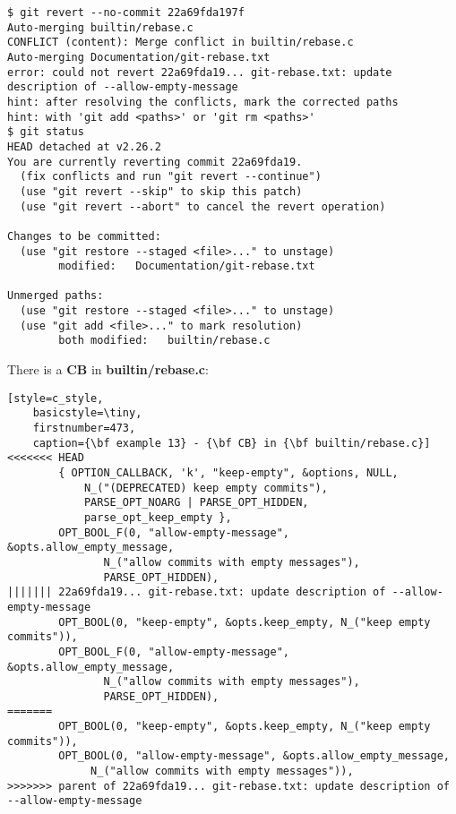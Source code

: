 \begin{lstlisting}[style=console_style,
	basicstyle=\tiny,
	caption={\bf example 13} - Reverting]
$ git revert --no-commit 22a69fda197f
Auto-merging builtin/rebase.c
CONFLICT (content): Merge conflict in builtin/rebase.c
Auto-merging Documentation/git-rebase.txt
error: could not revert 22a69fda19... git-rebase.txt: update description of --allow-empty-message
hint: after resolving the conflicts, mark the corrected paths
hint: with 'git add <paths>' or 'git rm <paths>'
$ git status
HEAD detached at v2.26.2
You are currently reverting commit 22a69fda19.
  (fix conflicts and run "git revert --continue")
  (use "git revert --skip" to skip this patch)
  (use "git revert --abort" to cancel the revert operation)

Changes to be committed:
  (use "git restore --staged <file>..." to unstage)
        modified:   Documentation/git-rebase.txt

Unmerged paths:
  (use "git restore --staged <file>..." to unstage)
  (use "git add <file>..." to mark resolution)
        both modified:   builtin/rebase.c
\end{lstlisting}

There is a {\bf CB} in {\bf builtin/rebase.c}:
\begin{lstlisting}[style=c_style,
	basicstyle=\tiny,
	firstnumber=473,
	caption={\bf example 13} - {\bf CB} in {\bf builtin/rebase.c}]
<<<<<<< HEAD
		{ OPTION_CALLBACK, 'k', "keep-empty", &options, NULL,
			N_("(DEPRECATED) keep empty commits"),
			PARSE_OPT_NOARG | PARSE_OPT_HIDDEN,
			parse_opt_keep_empty },
		OPT_BOOL_F(0, "allow-empty-message", &opts.allow_empty_message,
			   N_("allow commits with empty messages"),
			   PARSE_OPT_HIDDEN),
||||||| 22a69fda19... git-rebase.txt: update description of --allow-empty-message
		OPT_BOOL(0, "keep-empty", &opts.keep_empty, N_("keep empty commits")),
		OPT_BOOL_F(0, "allow-empty-message", &opts.allow_empty_message,
			   N_("allow commits with empty messages"),
			   PARSE_OPT_HIDDEN),
=======
		OPT_BOOL(0, "keep-empty", &opts.keep_empty, N_("keep empty commits")),
		OPT_BOOL(0, "allow-empty-message", &opts.allow_empty_message,
			 N_("allow commits with empty messages")),
>>>>>>> parent of 22a69fda19... git-rebase.txt: update description of --allow-empty-message
\end{lstlisting}

